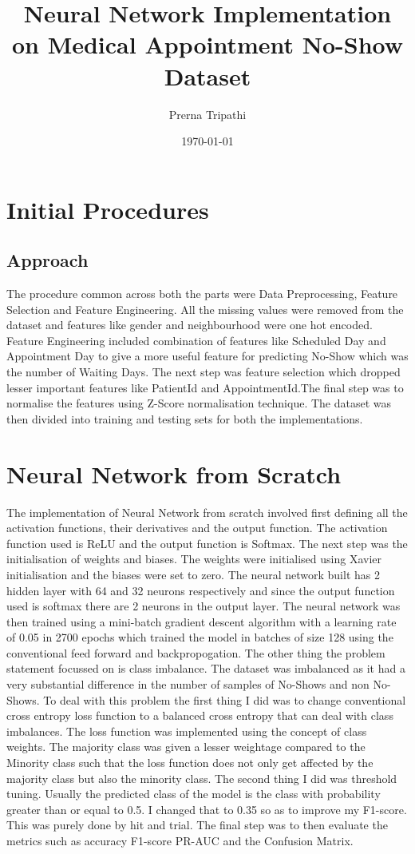 \documentclass[12pt]{article}
\title{Neural Network Implementation on Medical Appointment No-Show Dataset}
\author{Prerna Tripathi}
\date{\today}
\begin{document}
\maketitle
\onehalfspacing

\section{Initial Procedures}
\subsection{Approach}
The procedure common across both the parts were Data Preprocessing, Feature Selection and Feature Engineering. All the missing values were removed from the dataset and features like gender and neighbourhood were one hot encoded. Feature Engineering included combination of features like Scheduled Day and Appointment Day to give a more useful feature for predicting No-Show which was the number of Waiting Days.
The next step was feature selection which dropped lesser important features like PatientId and AppointmentId.The final step was to normalise the features using Z-Score normalisation technique.
The dataset was then divided into training and testing sets for both the implementations.
\section{Neural Network from Scratch}
The implementation of Neural Network from scratch involved first defining all the activation functions, their derivatives and the output function. The activation function used is ReLU and the output function is Softmax. 
The next step was the initialisation of weights and biases. The weights were initialised using Xavier initialisation and the biases were set to zero. The neural network built has 2 hidden layer with 64 and 32 neurons respectively and since the output function used is softmax there are 2 neurons in the output layer.
The neural network was then trained using a mini-batch gradient descent algorithm with a learning rate of 0.05 in 2700 epochs which trained the model in batches of size 128 using the conventional feed forward and backpropogation.
The other thing the problem statement focussed on is class imbalance. The dataset was imbalanced as it had a very substantial difference in the number of samples of No-Shows and non No-Shows.
To deal with this problem the first thing I did was to change conventional cross entropy loss function to a balanced cross entropy that can deal with class imbalances. The loss function was implemented using the concept of class weights. The majority class was given a lesser weightage compared to the Minority class such that the loss function does not only get affected by the majority class but also the minority class.
The second thing I did was threshold tuning. Usually the predicted class of the model is the class with probability greater than or equal to 0.5. I changed that to 0.35 so as to improve my F1-score. This was purely done by hit and trial.
The final step was to then evaluate the metrics such as accuracy F1-score PR-AUC and the Confusion Matrix.
\end{document}
